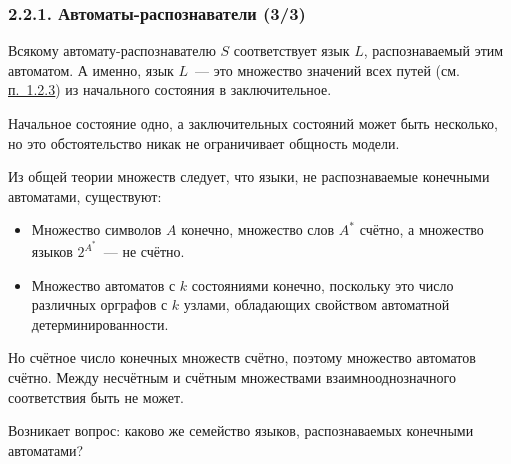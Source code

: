 \documentclass[mathserif,12pt,aspectratio=169]{beamer}
\def\DMref#1#2{{\color{blue}\underline{\hyperlink{#2}{#1}}}}
\begin{document}
\begin{frame}
\frametitle{2.2.1. Автоматы-распознаватели (3/3)}
Всякому автомату-распознавателю $S$ соответствует язык $L$,
распознаваемый этим автоматом. А именно, язык $L$~--- это
множество значений всех путей (см. \DMref{п.~1.2.3}{1.2.3.}) из начального состояния в
заключительное.
\begin{remark}
Начальное состояние одно, а заключительных состояний может быть несколько,
но это обстоятельство никак не ограничивает общность модели.
\end{remark}

\smallskip
Из общей теории множеств следует, что языки, 
не распознаваемые конечными автоматами, существуют:
\begin{itemize}
    \item Множество символов $A$ конечно,
    множество слов $A^*$  счётно, а множество языков $2^{A^*}$~--- не
    счётно.
    \item Множество автоматов с $k$ состояниями конечно, 
    поскольку это число различных орграфов с $k$ узлами, 
    обладающих свойством автоматной детерминированности.
\end{itemize}

\smallskip
Но счётное
число конечных множеств счётно, поэтому множество автоматов
счётно. Между несчётным и счётным множествами взаимнооднозначного
соответствия быть не может.

\medskip
Возникает вопрос: каково же семейство языков, распознаваемых конечными автоматами?
\end{frame}
\end{document}
